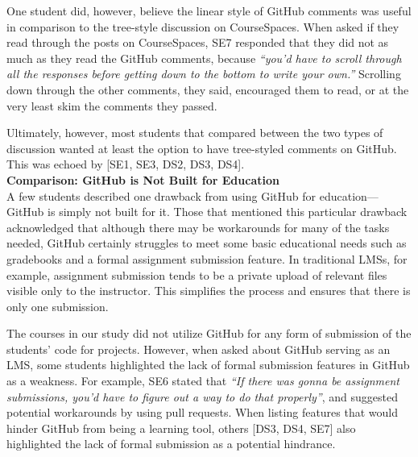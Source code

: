 One student did, however, believe the linear style of GitHub comments was useful in comparison to the tree-style discussion on CourseSpaces. When asked if they read through the posts on CourseSpaces, SE7 responded that they did not as much as they read the GitHub comments, because \textit{``you'd have to scroll through all the responses before getting down to the bottom to write your own.''} Scrolling down through the other comments, they said, encouraged them to read, or at the very least skim the comments they passed. %


Ultimately, however, most students that compared between the two types of discussion wanted at least the option to have tree-styled comments on GitHub. This was echoed by [SE1, SE3, DS2, DS3, DS4]. \\

\textbf{Comparison: GitHub is Not Built for Education} \\
A few students described one drawback from using GitHub for education---GitHub is simply not built for it. Those that mentioned this particular drawback acknowledged that although there may be workarounds for many of the tasks needed, GitHub certainly struggles to meet some basic educational needs such as gradebooks and a formal assignment submission feature. In traditional LMSs, for example, assignment submission tends to be a private upload of relevant files visible only to the instructor. This simplifies the process and ensures that there is only one submission.

The courses in our study did not utilize GitHub for any form of submission of the students' code for projects. However, when asked about GitHub serving as an LMS, some students highlighted the lack of formal submission features in GitHub as a weakness. For example, SE6 stated that \textit{``If there was gonna be assignment submissions, you'd have to figure out a way to do that properly''}, and suggested potential workarounds by using pull requests. When listing features that would hinder GitHub from being a learning tool, others [DS3, DS4, SE7] also highlighted the lack of formal submission as a potential hindrance.

